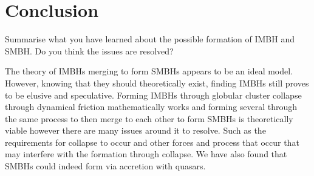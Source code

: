 \documentclass[a4paper]{article} %
\begin{document}
\section{Conclusion}
\begin{framed}
Summarise what you have learned about the possible formation of IMBH and SMBH. Do you think the issues are resolved?
\end{framed}
The theory of IMBHs merging to form SMBHs appears to be an ideal model. However, knowing that they should theoretically exist, finding IMBHs still proves to be elusive and speculative. Forming IMBHs through globular cluster collapse through dynamical friction mathematically works and forming several through the same process to then merge to each other to form SMBHs is theoretically viable however there are many issues around it to resolve. Such as the requirements for collapse to occur and other forces and process that occur that may interfere with the formation through collapse. We have also found that SMBHs could indeed form via accretion with quasars.




%
%
\end{document}
